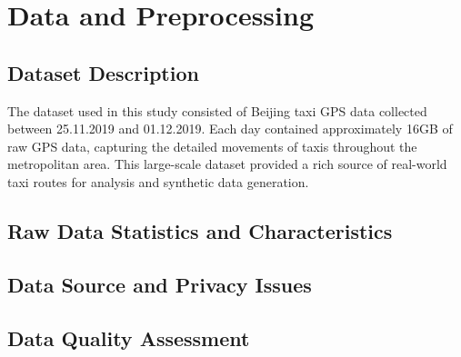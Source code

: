 \documentclass[runningheads]{llncs}
\begin{document}
\section{Data and Preprocessing}
\label{sec:data-preprocessing}

\subsection{Dataset Description}
\label{sec:data}

The dataset used in this study consisted of Beijing taxi GPS data collected between 25.11.2019 and 01.12.2019. Each day contained approximately 16GB of raw GPS data, capturing the detailed movements of taxis throughout the metropolitan area. This large-scale dataset provided a rich source of real-world taxi routes for analysis and synthetic data generation.

\subsection{Raw Data Statistics and Characteristics}
\label{sec:raw-data}

\begin{compactoutline}
\end{compactoutline}

\subsection{Data Source and Privacy Issues}
\label{sec:data-source}

\begin{compactoutline}
\end{compactoutline}

\subsection{Data Quality Assessment}
\label{sec:quality-assessment}
\end{document}
